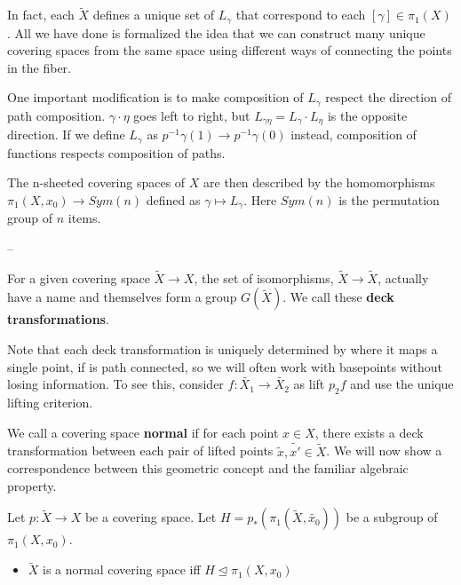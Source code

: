 \documentclass[10pt]{article}
\begin{document}
In fact, each $\tilde{X}$ defines a unique set of $L_{\gamma}$ that correspond
to each $[\gamma] \in \pi_1(X)$. All we have done is formalized the idea that
we can construct many unique covering spaces from the same space using
different ways of connecting the points in the fiber.

One important modification is to make composition of $L_{\gamma}$ respect the
direction of path composition. $\gamma \cdot \eta$ goes left to right, but
$L_{\gamma \eta} = L_{\gamma}\cdot L_{\eta}$ is the opposite direction. If we
define $L_{\gamma}$ as $p^{-1}{\gamma(1)} \to p^{-1}{\gamma(0)}$ instead,
composition of functions respects composition of paths.

The n-sheeted covering spaces of $X$ are then described by the homomorphisms
$\pi_1(X, x_0) \to Sym(n)$ defined as $\gamma \mapsto L_{\gamma}$. Here
$Sym(n)$ is the permutation group of $n$ items.

--

For a given covering space $\tilde{X} \to X$, the set of isomorphisms,
$\tilde{X} \to \tilde{X}$, actually have a name and themselves form a group
$G(\tilde{X})$. We call these \textbf{deck transformations}.

Note that each deck transformation is uniquely determined by where it maps a
single point, if  is path connected, so we will often work with basepoints without losing information.
To see this, consider $f: \tilde{X_1} \to \tilde{X_2}$ as lift $p_2f$ and use
the unique lifting criterion.

We call a covering space \textbf{normal} if for each point $x \in X$, there
exists a deck transformation between each pair of lifted points $\tilde{x},
\tilde{x'} \in \tilde{X}$. We will now show a correspondence between this
geometric concept and the familiar algebraic property.

\begin{definition}
	Let $p: \tilde{X} \to X$ be a covering space. Let $H = p_*(\pi_1(\tilde{X},
	\tilde{x_0}))$ be a subgroup of $\pi_1(X, x_0)$.
	\begin{itemize}
		\item{$\tilde{X}$ is a normal covering space iff $H \trianglelefteq \pi_1(X, x_0)$}
	\end{itemize}
\end{definition}
\end{document}

